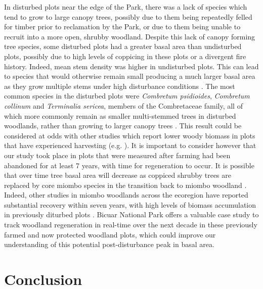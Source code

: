 \begin{refsection}
In disturbed plots near the edge of the Park, there was a lack of species which tend to grow to large canopy trees, possibly due to them being repeatedly felled for timber prior to reclamation by the Park, or due to them being unable to recruit into a more open, shrubby woodland. Despite this lack of canopy forming tree species, some disturbed plots had a greater basal area than undisturbed plots, possibly due to high levels of coppicing in these plots or a divergent fire history. Indeed, mean stem density was higher in undisturbed plots. This can lead to species that would otherwise remain small producing a much larger basal area as they grow multiple stems under high disturbance conditions \citep{Luoga2004}. The most common species in the disturbed plots were \textit{Combretum psidioides}, \textit{Combretum collinum} and \textit{Terminalia sericea}, members of the Combretaceae family, all of which more commonly remain as smaller multi-stemmed trees in disturbed woodlands, rather than growing to larger canopy trees \citep{Wyk2014}. This result could be considered at odds with other studies which report lower woody biomass in plots that have experienced harvesting (e.g. \citealt{Muvengwi2020}). It is important to consider however that our study took place in plots that were measured after farming had been abandoned for at least 7 years, with time for regeneration to occur. It is possible that over time tree basal area will decrease as coppiced shrubby trees are replaced by core miombo species in the transition back to miombo woodland \citep{Goncalves2017}. Indeed, other studies in miombo woodlands across the ecoregion have reported substantial recovery within seven years, with high levels of biomass accumulation in previously diturbed plots \citep{Chidumayo2013, Goncalves2017}. Bicuar National Park offers a valuable case study to track woodland regeneration in real-time over the next decade in these previously farmed and now protected woodland plots, which could improve our understanding of this potential post-disturbance peak in basal area.

\section{Conclusion}
\label{bicuar:sec:conclusion}


\end{refsection}
